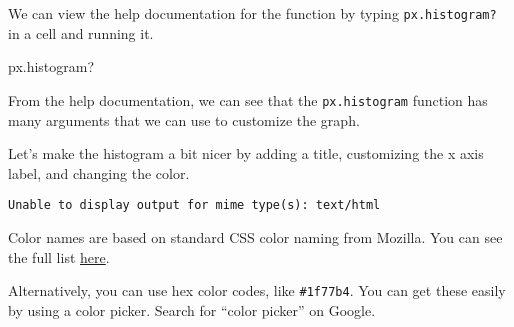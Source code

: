 \documentclass[
  letterpaper,
  DIV=11,
  numbers=noendperiod]{scrreprt}
\newenvironment{Shaded}{\begin{snugshade}}{\end{snugshade}}
\newcommand{\NormalTok}[1]{\textcolor[rgb]{0.00,0.23,0.31}{#1}}
\newcommand{\OperatorTok}[1]{\textcolor[rgb]{0.37,0.37,0.37}{#1}}
\newcommand{\StringTok}[1]{\textcolor[rgb]{0.13,0.47,0.30}{#1}}
\begin{document}
We can view the help documentation for the function by typing
\texttt{px.histogram?} in a cell and running it.

\begin{Shaded}
\begin{Highlighting}[]
\NormalTok{px.histogram?}
\end{Highlighting}
\end{Shaded}

From the help documentation, we can see that the \texttt{px.histogram}
function has many arguments that we can use to customize the graph.

Let's make the histogram a bit nicer by adding a title, customizing the
x axis label, and changing the color.

\begin{Shaded}
\end{Shaded}

\begin{verbatim}
Unable to display output for mime type(s): text/html
\end{verbatim}

Color names are based on standard CSS color naming from Mozilla. You can
see the full list
\href{https://developer.mozilla.org/en-US/docs/Web/CSS/named-color}{here}.

Alternatively, you can use hex color codes, like \texttt{\#1f77b4}. You
can get these easily by using a color picker. Search for ``color
picker'' on Google.

\begin{Shaded}
\end{Shaded}
\end{document}
